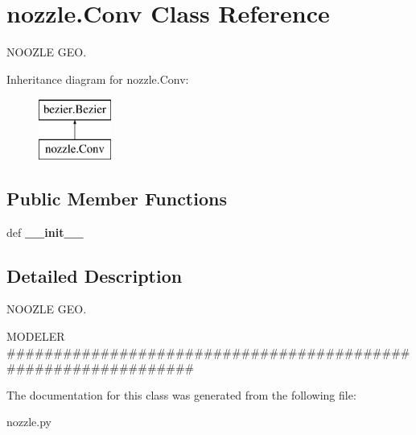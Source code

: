 \hypertarget{classnozzle_1_1Conv}{\section{nozzle.\-Conv \-Class \-Reference}
\label{classnozzle_1_1Conv}
}


\-N\-O\-O\-Z\-L\-E \-G\-E\-O.  


\-Inheritance diagram for nozzle.\-Conv\-:\begin{figure}[H]
\begin{center}
\leavevmode
\includegraphics[height=2.000000cm]{classnozzle_1_1Conv}
\end{center}
\end{figure}
\subsection*{\-Public \-Member \-Functions}
\begin{DoxyCompactItemize}
\item 
\hypertarget{classnozzle_1_1Conv_a5bca41eac14d44bc02a31a8c66e05f95}{def {\bfseries \-\_\-\-\_\-init\-\_\-\-\_\-}}\label{classnozzle_1_1Conv_a5bca41eac14d44bc02a31a8c66e05f95}

\end{DoxyCompactItemize}


\subsection{\-Detailed \-Description}
\-N\-O\-O\-Z\-L\-E \-G\-E\-O. 

\-M\-O\-D\-E\-L\-E\-R \#\#\#\#\#\#\#\#\#\#\#\#\#\#\#\#\#\#\#\#\#\#\#\#\#\#\#\#\#\#\#\#\#\#\#\#\#\#\#\#\#\#\#\#\#\#\#\#\#\#\#\#\#\#\#\#\#\#\#\#\#\#\# 

\-The documentation for this class was generated from the following file\-:\begin{DoxyCompactItemize}
\item 
nozzle.\-py\end{DoxyCompactItemize}
